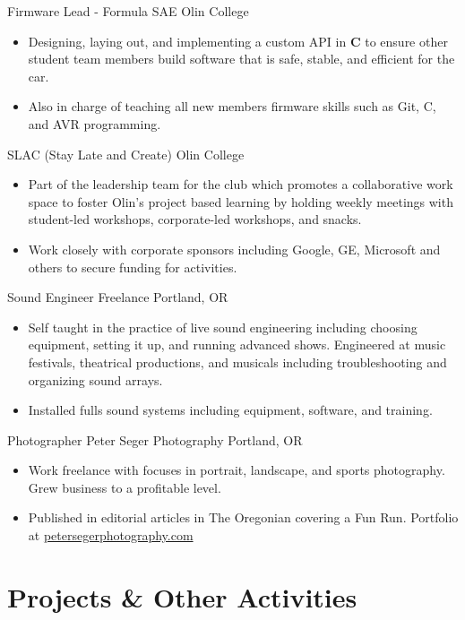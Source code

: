 \documentclass[11 pt]{moderncv}
\begin{document}
{Firmware Lead - Formula SAE}
{Olin College}
{}
{}
{
\begin{itemize}
	\item Designing, laying out, and implementing a custom API in \textbf{C} to ensure other student team members build software that is safe, stable, and efficient for the car. 
	\item Also in charge of teaching all new members firmware skills such as Git, C, and AVR programming.
\end{itemize}
}

{SLAC (Stay Late and Create)}
{Olin College}
{}
{}
{
\begin{itemize}
	\item Part of the leadership team for the club which promotes a collaborative work space to foster Olin's project based learning by holding weekly meetings with student-led workshops, corporate-led workshops, and snacks. 
	\item Work closely with corporate sponsors including Google, GE, Microsoft and others to secure funding for activities. 
\end{itemize}
}

{Sound Engineer}
{Freelance}
{Portland, OR}
{}
{
\begin{itemize}
	\item Self taught in the practice of live sound engineering including choosing equipment, setting it up, and running advanced shows. Engineered at music festivals, theatrical productions, and musicals including troubleshooting and organizing sound arrays. 
	\item Installed fulls sound systems including equipment, software, and training.
\end{itemize}
}

{Photographer}
{Peter Seger Photography}
{Portland, OR}
{}
{
\begin{itemize}
	\item Work freelance with focuses in portrait, landscape, and sports photography. Grew business to a profitable level.
	\item Published in editorial articles in The Oregonian covering a Fun Run. Portfolio at \href{www.petersegerphotography.com}{petersegerphotography.com}
\end{itemize}
}


\vspace{0.03 in}
\section{Projects \& Other Activities}
\end{document}
